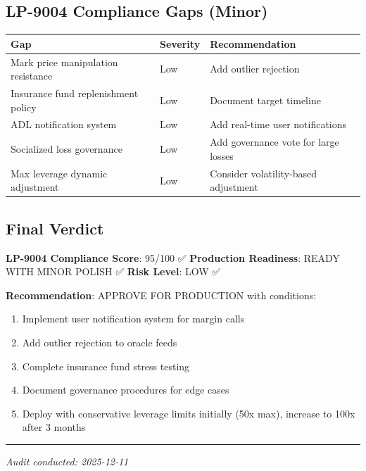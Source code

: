 \documentclass[
]{article}
\newcounter{none} %
\providecommand{\tightlist}{%
  \setlength{\itemsep}{0pt}\setlength{\parskip}{0pt}}
\begin{document}
\subsection{LP-9004 Compliance Gaps
(Minor)}\label{lp-9004-compliance-gaps-minor}

{\def\LTcaptype{none} %
\begin{longtable}[]{@{}lll@{}}
\toprule\noalign{}
Gap & Severity & Recommendation \\
\midrule\noalign{}
\endhead
\bottomrule\noalign{}
\endlastfoot
Mark price manipulation resistance & Low & Add outlier rejection \\
Insurance fund replenishment policy & Low & Document target timeline \\
ADL notification system & Low & Add real-time user notifications \\
Socialized loss governance & Low & Add governance vote for large
losses \\
Max leverage dynamic adjustment & Low & Consider volatility-based
adjustment \\
\end{longtable}
}

\subsection{Final Verdict}\label{final-verdict}

\textbf{LP-9004 Compliance Score}: 95/100 ✅ \textbf{Production
Readiness}: READY WITH MINOR POLISH ✅ \textbf{Risk Level}: LOW ✅

\textbf{Recommendation}: APPROVE FOR PRODUCTION with conditions:

\begin{enumerate}
\def\labelenumi{\arabic{enumi}.}
\tightlist
\item
  Implement user notification system for margin calls
\item
  Add outlier rejection to oracle feeds
\item
  Complete insurance fund stress testing
\item
  Document governance procedures for edge cases
\item
  Deploy with conservative leverage limits initially (50x max), increase
  to 100x after 3 months
\end{enumerate}

\begin{center}\rule{0.5\linewidth}{0.5pt}\end{center}

\emph{Audit conducted: 2025-12-11}
\end{document}
